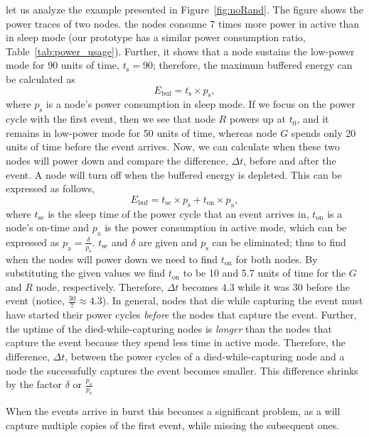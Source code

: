 \begin{itemize}
		let us analyze the example presented in Figure~\ref{fig:noRand}. The figure shows the power traces of two nodes. the nodes consume 7 times more power in active than in sleep mode (our prototype has a similar power consumption ratio, Table~\ref{tab:power_usage}). Further, it shows that a node sustains the low-power mode for 90 units of time, $t_\text{s} = 90$; therefore, the maximum buffered energy can be calculated as 
		$$E_\text{buf}=t_\text{s} \times p_\text{s},$$
		where $p_\text{s}$ is a node's power consumption in sleep mode. If we focus on the power cycle with the first event, then we see that node $R$ powers up at $t_\text{0}$, and it remains in low-power mode for 50 units of time, whereas node $G$ spends only 20 units of time before the event arrives. Now, we can calculate when these two nodes will power down and compare the difference, $\Delta t$, before and after the event. A node will turn off when the buffered energy is depleted. This can be expressed as follows, 
		$$
		E_\text{buf} = t_\text{se} \times p_\text{s} + t_\text{on} \times p_\text{a},
		$$
		where $ t_\text{se}$ is the sleep time of the power cycle that an event arrives in, $t_\text{on}$ is a node's on-time and $p_\text{a}$ is the power consumption in active mode, which can be expressed as $p_\text{a}=\frac{\delta}{p_\text{s}}$. $ t_\text{se}$ and $ \delta$ are given and $p_\text{s}$ can be eliminated; thus to find when the nodes will power down we need to find $t_\text{on}$ for both nodes. By substituting the given values we find $t_\text{on}$ to be 10 and 5.7 units of time for the $G$ and $R$ node, respectively. Therefore, $\Delta t$ becomes 4.3 while it was 30 before the event (notice, $\frac{30}{7} \approx 4.3$). 
		In general, nodes that die while capturing the event must have started their power cycles \emph{before} the nodes that capture the event.
		Further, the uptime of the died-while-capturing nodes is \emph{longer} than the nodes that capture the event because they spend less time in active mode. Therefore, the difference,  $\Delta t$, between the power cycles of a died-while-capturing node and a node the successfully captures the event becomes smaller. This difference shrinks by the factor $\delta$ or $\frac{p_\text{a}}{p_\text{s}}$


		When the events arrive in burst this becomes a significant problem, as a \cis will capture multiple copies of the first event, while missing the subsequent ones. 


\end{itemize}

